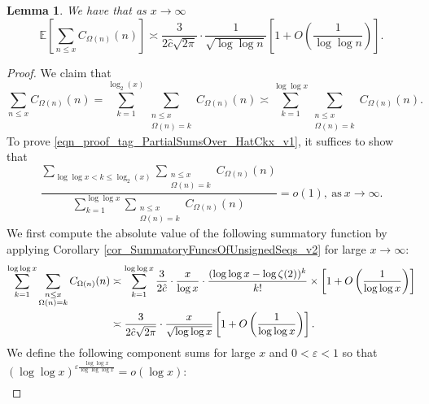 \documentclass[11pt,reqno,a4letter]{article}
\numberwithin{figure}{section}
\numberwithin{table}{section}
\theoremstyle{plain}
\newtheorem{lemma}[theorem]{Lemma}
\numberwithin{theorem}{section}
\theoremstyle{definition}
\begin{document}
\begin{lemma} 
\label{lemma_HatCAstxSum_ExactFormulaWithError_v1} 
We have that as $x \rightarrow \infty$ 
\[
\mathbb{E}\left[\sum_{n \leq x} C_{\Omega(n)}(n)\right]
     \asymp \frac{3}{2\hat{c} \sqrt{2\pi}} \cdot \frac{1}{\sqrt{\log\log n}}\left[1 + 
     O\left(\frac{1}{\log\log n}\right)\right]. 
\] 
\end{lemma} 
\begin{proof} 
We claim that 
\begin{equation} 
\label{eqn_proof_tag_PartialSumsOver_HatCkx_v1} 
\sum_{n \leq x} C_{\Omega(n)}(n) = 
     \sum_{k=1}^{\log_2(x)} \sum_{\substack{n \leq x \\ \Omega(n) = k}} C_{\Omega(n)}(n) \asymp 
     \sum_{k=1}^{\log\log x} \sum_{\substack{n \leq x \\ \Omega(n) = k}} C_{\Omega(n)}(n). 
\end{equation} 
To prove \eqref{eqn_proof_tag_PartialSumsOver_HatCkx_v1}, it suffices to show that 
\begin{equation} 
\label{eqn_proof_tag_PartialSumsOver_HatCkx_EquivCond_v2} 
\frac{\sum\limits_{\log\log x < k \leq \log_2(x)} \sum\limits_{\substack{n \leq x \\ \Omega(n) = k}} C_{\Omega(n)}(n)}{ 
     \sum\limits_{k=1}^{\log\log x} \sum\limits_{\substack{n \leq x \\ \Omega(n) = k}} C_{\Omega(n)}(n)} = o(1), 
     \mathrm{\ as\ } x \rightarrow \infty. 
\end{equation} 
We first compute the absolute value of the following 
summatory function by applying 
Corollary \ref{cor_SummatoryFuncsOfUnsignedSeqs_v2} for 
large $x \rightarrow \infty$: 
\begin{align} 
\notag 
\sum_{k=1}^{\log\log x} \sum_{\substack{n \leq x \\ \Omega(n) = k}} C_{\Omega(n)}(n) & \asymp 
     \sum_{k=1}^{\log\log x} \frac{3}{2\hat{c}} \cdot \frac{x}{\log x} \cdot 
     \frac{(\log\log x - \log\zeta(2))^{k}}{k!} \times \left[1 + 
     O\left(\frac{1}{\log\log x}\right)\right] \\ 
\label{eqn_proof_tag_PartialSumsOver_HatCkx_v3} 
     & \asymp \frac{3}{2\hat{c} \sqrt{2\pi}} \cdot \frac{x}{\sqrt{\log\log x}}\left[1 + 
     O\left(\frac{1}{\log\log x}\right)\right]. 
\end{align} 
We define the following component sums for large $x$ and $0 < \varepsilon < 1$ so that 
$(\log\log x)^{\varepsilon \frac{\log\log x}{\log\log\log x}} = o(\log x)$: 
\begin{align*} 

\end{align*}
\end{proof}
\end{document}
